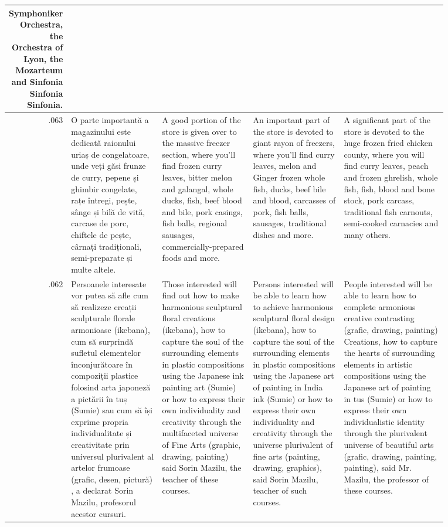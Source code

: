 \begin{table}[ht]
\begin{tabular}{r @{\hspace{1mm}} p{0.21\linewidth}p{0.21\linewidth}p{0.21\linewidth}p{0.24\linewidth}}
Symphoniker Orchestra, the Orchestra of Lyon, the Mozarteum and Sinfonia Sinfonia Sinfonia. \\\hline
.063 & O parte importantă a magazinului este dedicată raionului uriaș de congelatoare, unde veți găsi frunze de curry, pepene și ghimbir congelate, rațe întregi, pește, sânge și bilă de vită, carcase de porc, chiftele de pește, cârnați tradiționali, semi-preparate și multe altele. & A good portion of the store is given over to the massive freezer section, where you'll find frozen curry leaves, bitter melon and galangal, whole ducks, fish, beef blood and bile, pork casings, fish balls, regional sausages, commercially-prepared foods and more. & An important part of the store is devoted to giant rayon of freezers, where you'll find curry leaves, melon and Ginger frozen whole fish, ducks, beef bile and blood, carcasses of pork, fish balls, sausages, traditional dishes and more. & A significant part of the store is devoted to the huge frozen fried chicken county, where you will find curry leaves, peach and frozen ghrelish, whole fish, fish, blood and bone stock, pork carcass, traditional fish carnouts, semi-cooked carnacies and many others. \\\hline
.062 & Persoanele interesate vor putea să afle cum să realizeze creații sculpturale florale armonioase (ikebana), cum să surprindă sufletul elementelor înconjurătoare în compoziții plastice folosind arta japoneză a pictării în tuș (Sumie) sau cum să își exprime propria individualitate și creativitate prin universul plurivalent al artelor frumoase (grafic, desen, pictură) , a declarat Sorin Mazilu, profesorul acestor cursuri. & Those interested will find out how to make harmonious sculptural floral creations (ikebana), how to capture the soul of the surrounding elements in plastic compositions using the Japanese ink painting art (Sumie) or how to express their own individuality and creativity through the multifaceted universe of Fine Arts (graphic, drawing, painting) said Sorin Mazilu, the teacher of these courses. & Persons interested will be able to learn how to achieve harmonious sculptural floral design (ikebana), how to capture the soul of the surrounding elements in plastic compositions using the Japanese art of painting in India ink (Sumie) or how to express their own individuality and creativity through the universe plurivalent of fine arts (painting, drawing, graphics), said Sorin Mazilu, teacher of such courses. & People interested will be able to learn how to complete armonious creative contrasting (grafic, drawing, painting) Creations, how to capture the hearts of surrounding elements in artistic compositions using the Japanese art of painting in tus (Sumie) or how to express their own individualistic identity through the plurivalent universe of beautiful arts (grafic, drawing, painting, painting), said Mr. Mazilu, the professor of these courses. \\\hline

\end{tabular}
\end{table}
